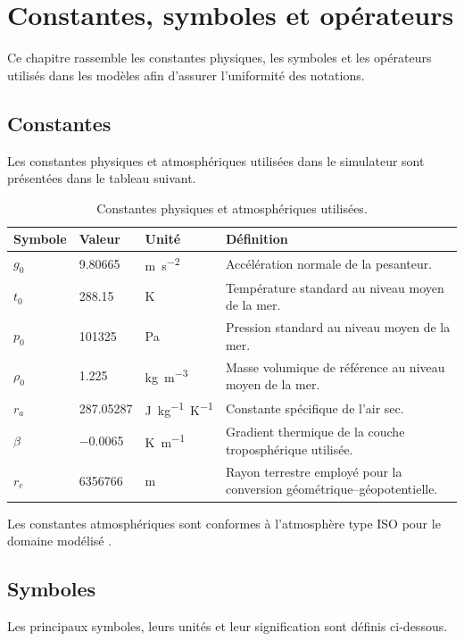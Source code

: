 \documentclass[11pt,a4paper,oneside]{report}
\begin{document}
	\chapter*{Constantes, symboles et opérateurs}
	
	Ce chapitre rassemble les constantes physiques, les symboles et les opérateurs utilisés dans les modèles afin d'assurer l'uniformité des notations.
	
	\section*{Constantes}
	Les constantes physiques et atmosphériques utilisées dans le simulateur sont présentées dans le tableau suivant.
	
	\begin{table}[H]
		\centering
		\caption{Constantes physiques et atmosphériques utilisées.}
		\label{tab_constantes}
		\begin{tabularx}{\textwidth}{@{}L{2.3cm}L{3.1cm}L{2.5cm}Y@{}}
			\toprule
			\textbf{Symbole} & \textbf{Valeur} & \textbf{Unité} & \textbf{Définition}\\
			\midrule
			$g_0$ & \num{9.80665} & \si{m.s^{-2}} & Accélération normale de la pesanteur.\\
			$t_0$ & \num{288.15} & \si{K} & Température standard au niveau moyen de la mer.\\
			$p_0$ & \num{101325} & \si{Pa} & Pression standard au niveau moyen de la mer.\\
			$\rho_0$ & \num{1.225} & \si{kg.m^{-3}} & Masse volumique de référence au niveau moyen de la mer.\\
			$r_a$ & \num{287.05287} & \si{J.kg^{-1}.K^{-1}} & Constante spécifique de l'air sec.\\
			$\beta$ & \num{-0.0065} & \si{K.m^{-1}} & Gradient thermique de la couche troposphérique utilisée.\\
			$r_e$ & \num{6356766} & \si{m} & Rayon terrestre employé pour la conversion géométrique--géopotentielle.\\
			\bottomrule
		\end{tabularx}
	\end{table}
	Les constantes atmosphériques sont conformes à l'atmosphère type ISO pour le domaine modélisé \cite{ISO2533_1975}.
	
	\section*{Symboles}
	Les principaux symboles, leurs unités et leur signification sont définis ci-dessous.
	
\end{document}

